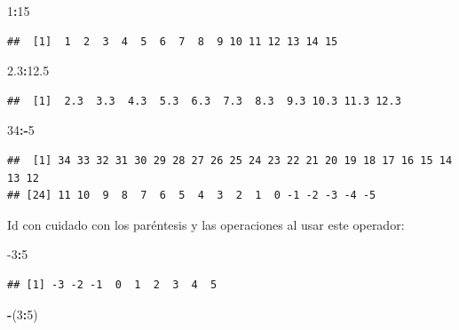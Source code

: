 \documentclass[]{book}
\newenvironment{Shaded}{\begin{snugshade}}{\end{snugshade}}
\newcommand{\DecValTok}[1]{\textcolor[rgb]{0.00,0.00,0.81}{#1}}
\newcommand{\FloatTok}[1]{\textcolor[rgb]{0.00,0.00,0.81}{#1}}
\newcommand{\NormalTok}[1]{#1}
\newcommand{\OperatorTok}[1]{\textcolor[rgb]{0.81,0.36,0.00}{\textbf{#1}}}
\theoremstyle{definition}
\theoremstyle{definition}
\theoremstyle{definition}
\theoremstyle{remark}
\begin{document}
\begin{Shaded}
\begin{Highlighting}[]
\DecValTok{1}\OperatorTok{:}\DecValTok{15}
\end{Highlighting}
\end{Shaded}

\begin{verbatim}
##  [1]  1  2  3  4  5  6  7  8  9 10 11 12 13 14 15
\end{verbatim}

\begin{Shaded}
\begin{Highlighting}[]
\FloatTok{2.3}\OperatorTok{:}\FloatTok{12.5}
\end{Highlighting}
\end{Shaded}

\begin{verbatim}
##  [1]  2.3  3.3  4.3  5.3  6.3  7.3  8.3  9.3 10.3 11.3 12.3
\end{verbatim}

\begin{Shaded}
\begin{Highlighting}[]
\DecValTok{34}\OperatorTok{:-}\DecValTok{5}
\end{Highlighting}
\end{Shaded}

\begin{verbatim}
##  [1] 34 33 32 31 30 29 28 27 26 25 24 23 22 21 20 19 18 17 16 15 14 13 12
## [24] 11 10  9  8  7  6  5  4  3  2  1  0 -1 -2 -3 -4 -5
\end{verbatim}

Id con cuidado con los paréntesis y las operaciones al usar este operador:

\begin{Shaded}
\begin{Highlighting}[]
\DecValTok{-3}\OperatorTok{:}\DecValTok{5}
\end{Highlighting}
\end{Shaded}

\begin{verbatim}
## [1] -3 -2 -1  0  1  2  3  4  5
\end{verbatim}

\begin{Shaded}
\begin{Highlighting}[]
\OperatorTok{-}\NormalTok{(}\DecValTok{3}\OperatorTok{:}\DecValTok{5}\NormalTok{)}
\end{Highlighting}
\end{Shaded}
\end{document}
